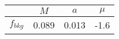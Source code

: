 \begin{tabular}{c||c|c|c}
 & $M$ & $a$ & $\mu$  \\
\hline
$f_{bkg}$  & 0.089 & 0.013 & -1.6\\
\end{tabular}
